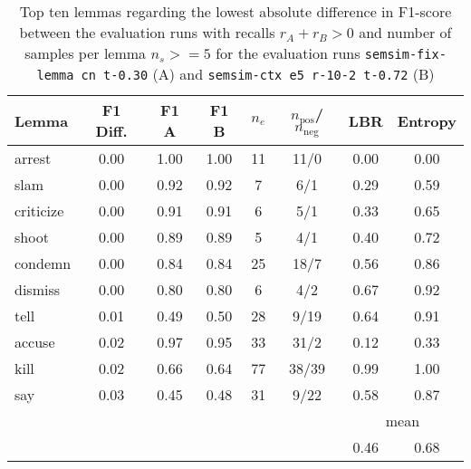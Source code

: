 \documentclass[11pt]{scrreprt}
\begin{document}
\begin{table}[htp]
\centering
\begin{tabular}{lccccccc}
\toprule
Lemma      & F1 Diff. & F1 A & F1 B & \(n_e\) & \(n_\text{pos}\)/\(n_\text{neg}\) & LBR & Entropy \\
\midrule
arrest     & 0.00      & 1.00           & 1.00           & 11              & 11/0    & 0.00 & 0.00 \\
slam       & 0.00      & 0.92           & 0.92           & 7               & 6/1     & 0.29 & 0.59 \\
criticize  & 0.00      & 0.91           & 0.91           & 6               & 5/1     & 0.33 & 0.65 \\
shoot      & 0.00      & 0.89           & 0.89           & 5               & 4/1     & 0.40 & 0.72 \\
condemn    & 0.00      & 0.84           & 0.84           & 25              & 18/7    & 0.56 & 0.86 \\
dismiss    & 0.00      & 0.80           & 0.80           & 6               & 4/2     & 0.67 & 0.92 \\
tell       & 0.01      & 0.49           & 0.50           & 28              & 9/19    & 0.64 & 0.91 \\
accuse     & 0.02      & 0.97           & 0.95           & 33              & 31/2    & 0.12 & 0.33 \\
kill       & 0.02      & 0.66           & 0.64           & 77              & 38/39   & 0.99 & 1.00 \\
say        & 0.03      & 0.45           & 0.48           & 31              & 9/22    & 0.58 & 0.87 \\
\cmidrule{7-8}
\multicolumn{6}{l}{} & \multicolumn{2}{c}{mean} \\
\multicolumn{6}{l}{} & 0.46 & 0.68 \\
\bottomrule
\end{tabular}
\caption{Top ten lemmas regarding the lowest absolute difference in F1-score between the evaluation runs with recalls \(r_A + r_B > 0\) and number of samples per lemma \(n_s >= 5\) for the evaluation runs \texttt{semsim-fix-lemma cn t-0.30} (A) and \texttt{semsim-ctx e5 r-10-2 t-0.72} (B)}
\label{tab:predicate-lemma-lowest-f1}
\end{table}
\end{document}
